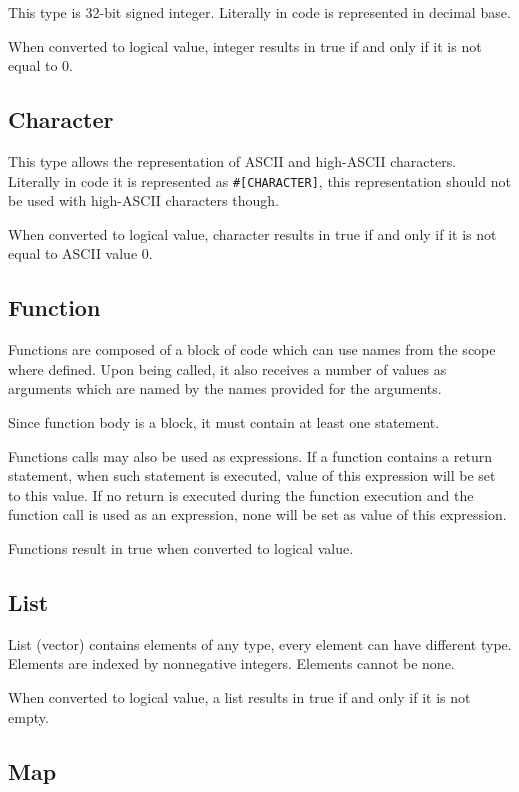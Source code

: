 \documentclass[a4paper,11pt,openany]{article}
\begin{document}
This type is 32-bit signed integer. Literally in code is represented in decimal base.

When converted to logical value, integer results in true if and only if it is not equal to 0.

\subsection{Character}

This type allows the representation of ASCII and high-ASCII characters. Literally in code it is represented as \texttt{\#[CHARACTER]}, this representation should not be used with high-ASCII characters though.

When converted to logical value, character results in true if and only if it is not equal to ASCII value 0.

\subsection{Function}

Functions are composed of a block of code which can use names from the scope where defined. Upon being called, it also receives a number of values as arguments which are named by the names provided for the arguments.

Since function body is a block, it must contain at least one statement.

Functions calls may also be used as expressions. If a function contains a return statement, when such statement is executed, value of this expression will be set to this value. If no return is executed during the function execution and the function call is used as an expression, none will be set as value of this expression.

Functions result in true when converted to logical value.

\subsection{List}

List (vector) contains elements of any type, every element can have different type.
Elements are indexed by nonnegative integers. Elements cannot be none.

When converted to logical value, a list results in true if and only if it is not empty.

\subsection{Map}
	
\end{document}
